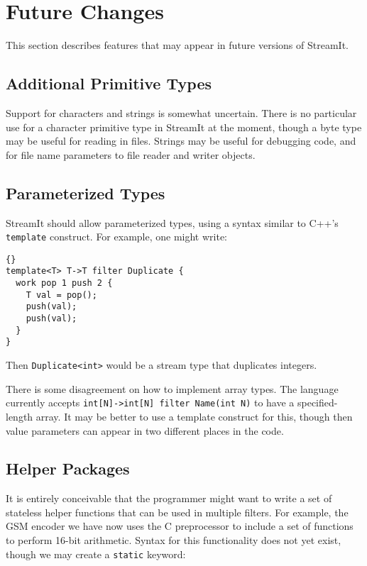 \section{Future Changes}

This section describes features that may appear in future versions of
StreamIt.

\subsection{Additional Primitive Types}

Support for characters and strings is somewhat uncertain.  There is no
particular use for a character primitive type in StreamIt at the
moment, though a byte type may be useful for reading in files.
Strings may be useful for debugging code, and for file name parameters
to file reader and writer objects.

\subsection{Parameterized Types}

StreamIt should allow parameterized types, using a syntax similar to
C++'s \lstinline|template| construct.  For example, one might write:

\begin{lstlisting}{}
template<T> T->T filter Duplicate {
  work pop 1 push 2 {
    T val = pop();
    push(val);
    push(val);
  }
}
\end{lstlisting}

Then \lstinline|Duplicate<int>| would be a stream type that duplicates
integers.

There is some disagreement on how to implement array types.  The
language currently accepts \lstinline|int[N]->int[N] filter Name(int N)| to
have a specified-length array.  It may be better to use a template
construct for this, though then value parameters can appear in two
different places in the code.

\subsection{Helper Packages}

It is entirely conceivable that the programmer might want to write a
set of stateless helper functions that can be used in multiple
filters.  For example, the GSM encoder we have now uses the C
preprocessor to include a set of functions to perform 16-bit
arithmetic.  Syntax for this functionality does not yet exist, though
we may create a \lstinline|static| keyword:

